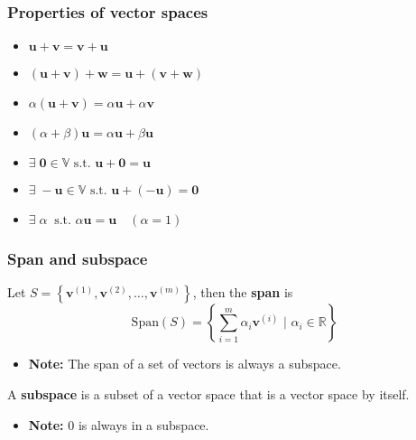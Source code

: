 \subsubsection{Properties of vector spaces}
\begin{definition}
    \begin{itemize}
        \item $\mathbf{u} + \mathbf{v} = \mathbf{v} + \mathbf{u}$
        \item $(\mathbf{u} + \mathbf{v}) + \mathbf{w} = \mathbf{u} + (\mathbf{v} + \mathbf{w})$
        \item $\alpha (\mathbf{u} + \mathbf{v}) = \alpha \mathbf{u} + \alpha \mathbf{v}$
        \item $(\alpha + \beta)\mathbf{u} = \alpha \mathbf{u} + \beta \mathbf{u}$
        \item $\exists\; \mathbf{0} \in \mathbb{V} \text{ s.t. } \mathbf{u} + \mathbf{0} = \mathbf{u}$
        \item $\exists\; -\mathbf{u} \in \mathbb{V} \text{ s.t. } \mathbf{u} + (-\mathbf{u}) = \mathbf{0}$
        \item $\exists\; \alpha \: \text{ s.t. } \alpha \mathbf{u} = \mathbf{u} \quad (\alpha = 1)$
    \end{itemize}
\end{definition}

\subsubsection{Span and subspace}
\begin{definition}
    Let \( S = \left\{\mathbf{v}^{(1)}, \mathbf{v}^{(2)}, \ldots, \mathbf{v}^{(m)}\right\} \), then the \textbf{span} is
    \begin{equation*}
        \text{Span}(S) = \left\{\sum_{i=1}^{m} \alpha_i \mathbf{v}^{(i)} \text{ | } \alpha_i \in \mathbb{R}\right\}
    \end{equation*}
    \begin{itemize}
        \item \textbf{Note:} The span of a set of vectors is always a subspace.
    \end{itemize}
\end{definition}

\begin{definition}
    A \textbf{subspace} is a subset of a vector space that is a vector space by itself.
    \begin{itemize}
        \item \textbf{Note:} $0$ is always in a subspace.
    \end{itemize}
\end{definition}

